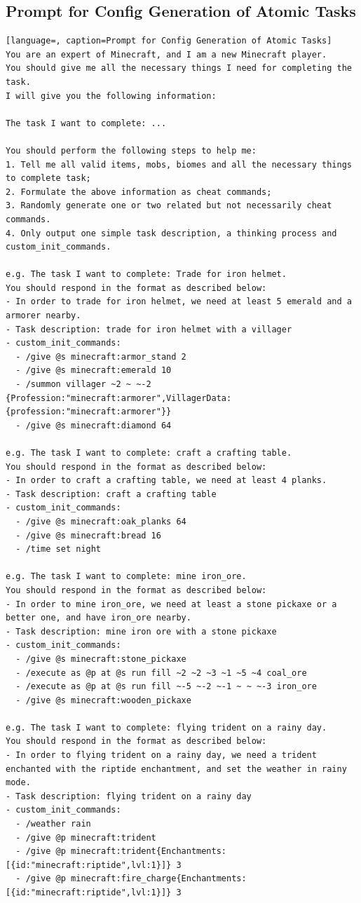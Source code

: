 \subsection{Prompt for Config Generation of Atomic Tasks}
\label{app:prompt_conf_gen}
\begin{lstlisting}[language=, caption=Prompt for Config Generation of Atomic Tasks]
You are an expert of Minecraft, and I am a new Minecraft player.
You should give me all the necessary things I need for completing the task. 
I will give you the following information:

The task I want to complete: ...

You should perform the following steps to help me:
1. Tell me all valid items, mobs, biomes and all the necessary things to complete task;
2. Formulate the above information as cheat commands;
3. Randomly generate one or two related but not necessarily cheat commands.
4. Only output one simple task description, a thinking process and custom_init_commands.

e.g. The task I want to complete: Trade for iron helmet.
You should respond in the format as described below:
- In order to trade for iron helmet, we need at least 5 emerald and a armorer nearby.
- Task description: trade for iron helmet with a villager
- custom_init_commands:
  - /give @s minecraft:armor_stand 2
  - /give @s minecraft:emerald 10
  - /summon villager ~2 ~ ~-2 {Profession:"minecraft:armorer",VillagerData:{profession:"minecraft:armorer"}}
  - /give @s minecraft:diamond 64

e.g. The task I want to complete: craft a crafting table.
You should respond in the format as described below:
- In order to craft a crafting table, we need at least 4 planks.
- Task description: craft a crafting table
- custom_init_commands:
  - /give @s minecraft:oak_planks 64
  - /give @s minecraft:bread 16
  - /time set night

e.g. The task I want to complete: mine iron_ore.
You should respond in the format as described below:
- In order to mine iron_ore, we need at least a stone pickaxe or a better one, and have iron_ore nearby.
- Task description: mine iron ore with a stone pickaxe
- custom_init_commands:
  - /give @s minecraft:stone_pickaxe
  - /execute as @p at @s run fill ~2 ~2 ~3 ~1 ~5 ~4 coal_ore 
  - /execute as @p at @s run fill ~-5 ~-2 ~-1 ~ ~ ~-3 iron_ore 
  - /give @s minecraft:wooden_pickaxe

e.g. The task I want to complete: flying trident on a rainy day.
You should respond in the format as described below:
- In order to flying trident on a rainy day, we need a trident enchanted with the riptide enchantment, and set the weather in rainy mode.
- Task description: flying trident on a rainy day
- custom_init_commands:
  - /weather rain
  - /give @p minecraft:trident 
  - /give @p minecraft:trident{Enchantments:[{id:"minecraft:riptide",lvl:1}]} 3
  - /give @p minecraft:fire_charge{Enchantments:[{id:"minecraft:riptide",lvl:1}]} 3


\end{lstlisting}
